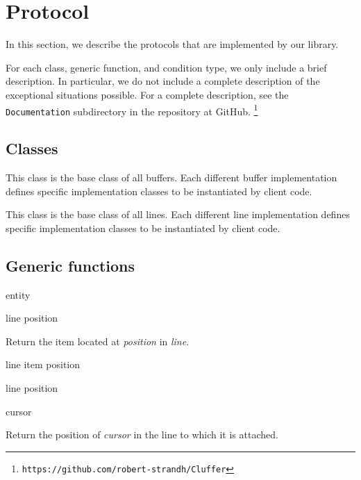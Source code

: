 \appendix

\section{Protocol}

In this section, we describe the protocols that are implemented by our
library.

For each class, generic function, and condition type, we only include
a brief description.  In particular, we do not include a complete
description of the exceptional situations possible.  For a complete
description, see the \texttt{Documentation} subdirectory in
the repository at GitHub.%
\footnote{\texttt{https://github.com/robert-strandh/Cluffer}}

\subsection{Classes}


This class is the base class of all buffers.  Each different buffer
implementation defines specific implementation classes to be
instantiated by client code.


This class is the base class of all lines.  Each different line
implementation defines specific implementation classes to be
instantiated by client code.


\subsection{Generic functions}

 {entity}

 {line position}

Return the item located at \textit{position} in \textit{line}.

 {line item position}

 {line position}

 {cursor}

Return the position of \textit{cursor} in the line to which it is
attached.
